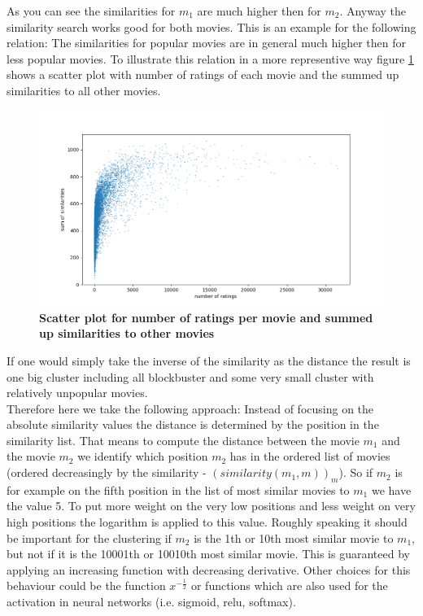 \documentclass{article}
\begin{document}
As you can see the similarities for $m_1$ are much higher then for $m_2$. Anyway the similarity search works good for both movies. This is an example for the following relation: The similarities for popular movies are in general much higher then for less popular movies. To illustrate this relation in a more representive way  figure \ref{fig_scatter_nr_ratings_similarity} shows a scatter plot with number of ratings of each movie and the summed  up similarities to all other movies.
\begin{figure}[t!]
\includegraphics[scale=0.5]{screenshots_app/scatter_nr_ratings_similarity.png}
\caption{\textbf{Scatter plot for number of ratings per movie and summed up similarities to other movies}}\label{fig_scatter_nr_ratings_similarity}
\end{figure}
If one would simply take the inverse of the similarity as the distance the result is one big cluster including all blockbuster and some very small cluster with relatively unpopular movies.\\
Therefore here we take the following approach: Instead of focusing on the absolute similarity values the distance is determined by the position in the similarity list. That means to compute the distance between the movie $m_1$ and the movie $m_2$ we identify which position $m_2$ has in the ordered list of movies (ordered  decreasingly by the similarity - $(similarity(m_1,m))_m$). So if $m_2$ is for example on the fifth position in the list of most similar movies to $m_1$ we have the value 5. To put more weight on the very low positions and less weight on very high positions the logarithm is applied to this value. Roughly speaking it should be important for the clustering if $m_2$ is the 1th or 10th most similar movie to $m_1$, but not if it is the 10001th or 10010th most similar movie. This is guaranteed by applying an increasing function with decreasing derivative. Other choices for this behaviour could be the function $x^{-\frac{1}{2}}$ or functions which are also used for the activation in neural networks (i.e. sigmoid, relu, softmax).
\end{document}
